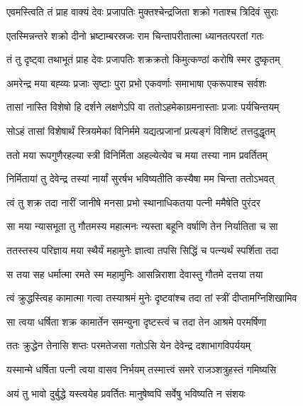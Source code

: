 \twolineshloka
{एवमस्त्विति तं प्राह वाक्यं देवः प्रजापतिः}
{मुक्तश्चेन्द्रजिता शक्रो गताश्च त्रिदिवं सुराः} %

\twolineshloka
{एतस्मिन्नन्तरे शक्रो दीनो भ्रष्टाम्बरस्रजः}
{राम चिन्तापरीतात्मा ध्यानतत्परतां गतः} %

\twolineshloka
{तं तु दृष्ट्वा तथाभूतं प्राह देवः प्रजापतिः}
{शक्रक्रतो किमुत्कण्ठां करोषि स्मर दुष्कृतम्} %

\twolineshloka
{अमरेन्द्र मया बह्व्यः प्रजाः सृष्टाः पुरा प्रभो}
{एकवर्णाः समाभाषा एकरूपाश्च सर्वशः} %

\twolineshloka
{तासां नास्ति विशेषो हि दर्शने लक्षणेऽपि वा}
{ततोऽहमेकाग्रमनास्ताः प्रजाः पर्यचिन्तयम्} %

\twolineshloka
{सोऽहं तासां विशेषार्थं स्त्रियमेकां विनिर्ममे}
{यद्यत्प्रजानां प्रत्यङ्गं विशिष्टं तत्तदुद्धृतम्} %

\twolineshloka
{ततो मया रूपगुणैरहल्या स्त्री विनिर्मिता}
{अहल्येत्येव च मया तस्या नाम प्रवर्तितम्} %

\twolineshloka
{निर्मितायां तु देवेन्द्र तस्यां नार्यां सुरर्षभ}
{भविष्यतीति कस्यैषा मम चिन्ता ततोऽभवत्} %

\twolineshloka
{त्वं तु शक्र तदा नारीं जानीषे मनसा प्रभो}
{स्थानाधिकतया पत्नी ममैषेति पुरंदर} %

\twolineshloka
{सा मया न्यासभूता तु गौतमस्य महात्मनः}
{न्यस्ता बहूनि वर्षाणि तेन निर्यातिता च सा} %

\twolineshloka
{ततस्तस्य परिज्ञाय मया स्थैर्यं महामुनेः}
{ज्ञात्वा तपसि सिद्धिं च पत्न्यर्थं स्पर्शिता तदा} %

\twolineshloka
{स तया सह धर्मात्मा रमते स्म महामुनिः}
{आसन्निराशा देवास्तु गौतमे दत्तया तया} %

\twolineshloka
{त्वं क्रुद्धस्त्विह कामात्मा गत्वा तस्याश्रमं मुनेः}
{दृष्टवांश्च तदा तां स्त्रीं दीप्तामग्निशिखामिव} %

\twolineshloka
{सा त्वया धर्षिता शक्र कामार्तेन समन्युना}
{दृष्टस्त्वं च तदा तेन आश्रमे परमर्षिणा} %

\twolineshloka
{ततः क्रुद्धेन तेनासि शप्तः परमतेजसा}
{गतोऽसि येन देवेन्द्र दशाभागविपर्ययम्} %

\twolineshloka
{यस्मान्मे धर्षिता पत्नी त्वया वासव निर्भयम्}
{तस्मात्त्वं समरे राजञ्शत्रुहस्तं गमिष्यसि} %

\twolineshloka
{अयं तु भावो दुर्बुद्धे यस्त्वयेह प्रवर्तितः}
{मानुषेष्वपि सर्वेषु भविष्यति न संशयः} %

